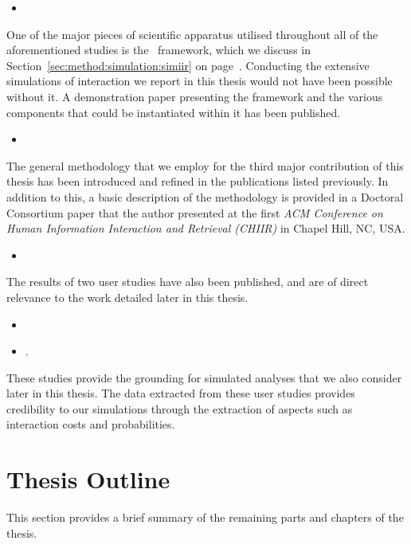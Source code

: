 \begin{itemize}
    \item{}
\end{itemize}

\noindent
{}
One of the major pieces of scientific apparatus utilised throughout all of the aforementioned studies is the \simiir~framework, which we discuss in Section~\ref{sec:method:simulation:simiir} on page~\pageref{sec:method:simulation:simiir}. Conducting the extensive simulations of interaction we report in this thesis would not have been possible without it. A demonstration paper presenting the framework and the various components that could be instantiated within it has been published.

\begin{itemize}
    \item{}
\end{itemize}

\noindent
{}
The general methodology that we employ for the third major contribution of this thesis has been introduced and refined in the publications listed previously. In addition to this, a basic description of the methodology is provided in a Doctoral Consortium paper that the author presented at the first \emph{ACM Conference on Human Information Interaction and Retrieval (CHIIR)} in Chapel Hill, NC, USA.

\begin{itemize}
    \item{}
\end{itemize}

The results of two user studies have also been published, and are of direct relevance to the work detailed later in this thesis.

\begin{itemize}
    \item{}
    \item{.}
\end{itemize}

These studies provide the grounding for simulated analyses that we also consider later in this thesis. The data extracted from these user studies provides credibility to our simulations through the extraction of aspects such as interaction costs and probabilities.

\section{Thesis Outline}
This section provides a brief summary of the remaining parts and chapters of the thesis.


